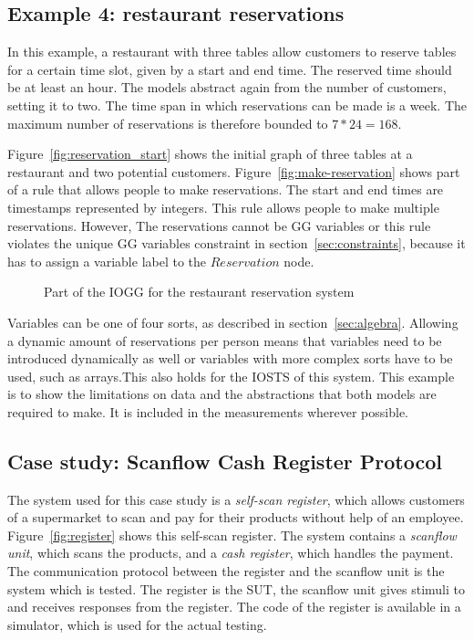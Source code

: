 \subsection{Example 4: restaurant reservations}
In this example, a restaurant with three tables allow customers to reserve tables for a certain time slot, given by a start and end time. The reserved time should be at least an hour. The models abstract again from the number of customers, setting it to two. The time span in which reservations can be made is a week. The maximum number of reservations is therefore bounded to $7*24=168$.

Figure~\ref{fig:reservation_start} shows the initial graph of three tables at a restaurant and two potential customers. Figure~\ref{fig:make-reservation} shows part of a rule that allows people to make reservations. The start and end times are timestamps represented by integers. This rule allows people to make multiple reservations. However, The reservations cannot be GG variables or this rule violates the unique GG variables constraint in section~\ref{sec:constraints}, because it has to assign a variable label to the $Reservation$ node.

\begin{figure}[ht]
  \begin{center}
    \hspace{20px}
  \end{center}
  \caption{Part of the IOGG for the restaurant reservation system}
  \label{fig:gg-reservation}
\end{figure}

Variables can be one of four sorts, as described in section~\ref{sec:algebra}. Allowing a dynamic amount of reservations per person means that variables need to be introduced dynamically as well or variables with more complex sorts have to be used, such as arrays.This also holds for the IOSTS of this system. This example is to show the limitations on data and the abstractions that both models are required to make. It is included in the measurements wherever possible.

\subsection{Case study: Scanflow Cash Register Protocol}\label{sec:scrp}
The system used for this case study is a \textit{self-scan register}, which allows customers of a supermarket to scan and pay for their products without help of an employee. Figure~\ref{fig:register} shows this self-scan register. The system contains a \textit{scanflow unit}, which scans the products, and a \textit{cash register}, which handles the payment. The communication protocol between the register and the scanflow unit is the system which is tested. The register is the SUT, the scanflow unit gives stimuli to and receives responses from the register. The code of the register is available in a simulator, which is used for the actual testing.

